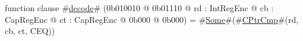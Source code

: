 function clause #\hyperref[sailMIPSzdecode]{decode}# (0b010010 @ 0b01110 @ rd : IntRegEnc @ cb : CapRegEnc @ ct : CapRegEnc @ 0b000 @ 0b000) = #\hyperref[sailMIPSzSome]{Some}#(#\hyperref[sailMIPSzCPtrCmp]{CPtrCmp}#(rd, cb, ct, CEQ))
